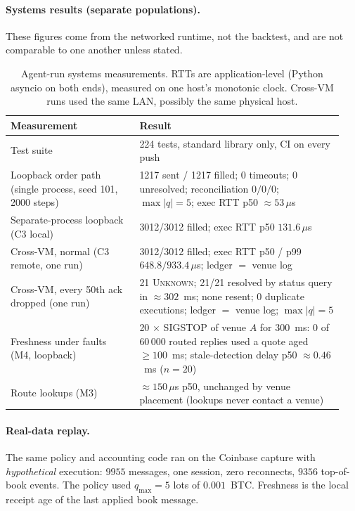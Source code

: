 \documentclass[11pt]{article}
\theoremstyle{remark}
\begin{document}
\paragraph{Systems results (separate populations).}
These figures come from the networked runtime, not the backtest, and are not comparable to one
another unless stated.

\begin{table}[h]
\centering
\small
\begin{tabular}{@{}p{0.36\linewidth}p{0.58\linewidth}@{}}
\toprule
Measurement & Result \\
\midrule
Test suite & 224 tests, standard library only, CI on every push \\
Loopback order path (single process, seed 101, 2000 steps)
  & 1217 sent / 1217 filled; 0 timeouts; 0 unresolved; reconciliation $0/0/0$;
    $\max|q| = 5$; exec RTT p50 $\approx 53\,\mu$s \\
Separate-process loopback (C3 local)
  & 3012/3012 filled; exec RTT p50 $131.6\,\mu$s \\
Cross-VM, normal (C3 remote, one run)
  & 3012/3012 filled; exec RTT p50 / p99 $648.8 / 933.4\,\mu$s; ledger $=$ venue log \\
Cross-VM, every 50th ack dropped (one run)
  & 21 \textsc{Unknown}; 21/21 resolved by status query in $\approx 302$~ms; none resent;
    0 duplicate executions; ledger $=$ venue log; $\max|q| = 5$ \\
Freshness under faults (M4, loopback)
  & 20 $\times$ SIGSTOP of venue $A$ for 300~ms: 0 of 60\,000 routed replies used a quote
    aged $\ge 100$~ms; stale-detection delay p50 $\approx 0.46$~ms ($n = 20$) \\
Route lookups (M3)
  & $\approx 150\,\mu$s p50, unchanged by venue placement (lookups never contact a venue) \\
\bottomrule
\end{tabular}
\caption{Agent-run systems measurements. RTTs are application-level (Python asyncio on both
ends), measured on one host's monotonic clock. Cross-VM runs used the same LAN, possibly the
same physical host.}
\end{table}

\paragraph{Real-data replay.}
The same policy and accounting code ran on the Coinbase capture with \emph{hypothetical}
execution: $9955$ messages, one session, zero reconnects, $9356$ top-of-book events. The policy
used $q_{\max} = 5$ lots of $0.001$~BTC. Freshness is the local receipt age of the last applied
book message.
\end{document}
